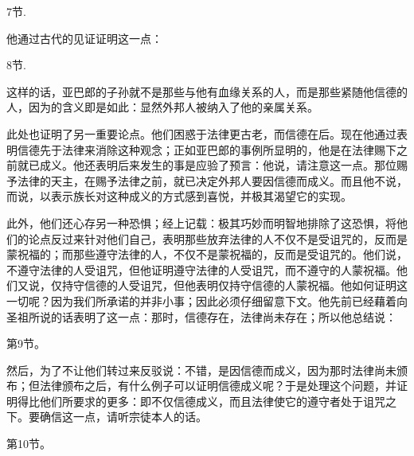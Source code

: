 7节. \par

他通过古代的见证证明这一点：\par

8节. \par

这样的话，亚巴郎的子孙就不是那些与他有血缘关系的人，而是那些紧随他信德的人，因为的含义即是如此：显然外邦人被纳入了他的亲属关系。\par

此处也证明了另一重要论点。他们困惑于法律更古老，而信德在后。现在他通过表明信德先于法律来消除这种观念；正如亚巴郎的事例所显明的，他是在法律赐下之前就已成义。他还表明后来发生的事是应验了预言：他说，请注意这一点。那位赐予法律的天主，在赐予法律之前，就已决定外邦人要因信德而成义。而且他不说，而说，以表示族长对这种成义的方式感到喜悦，并极其渴望它的实现。\par

此外，他们还心存另一种恐惧；经上记载：极其巧妙而明智地排除了这恐惧，将他们的论点反过来针对他们自己，表明那些放弃法律的人不仅不是受诅咒的，反而是蒙祝福的；而那些遵守法律的人，不仅不是蒙祝福的，反而是受诅咒的。他们说，不遵守法律的人受诅咒，但他证明遵守法律的人受诅咒，而不遵守的人蒙祝福。他们又说，仅持守信德的人受诅咒，但他表明仅持守信德的人蒙祝福。他如何证明这一切呢？因为我们所承诺的并非小事；因此必须仔细留意下文。他先前已经藉着向圣祖所说的话表明了这一点：那时，信德存在，法律尚未存在；所以他总结说：\par

第9节。\par

然后，为了不让他们转过来反驳说：不错，是因信德而成义，因为那时法律尚未颁布；但法律颁布之后，有什么例子可以证明信德成义呢？于是处理这个问题，并证明得比他们所要求的更多：即不仅信德成义，而且法律使它的遵守者处于诅咒之下。要确信这一点，请听宗徒本人的话。\par

第10节。\par

